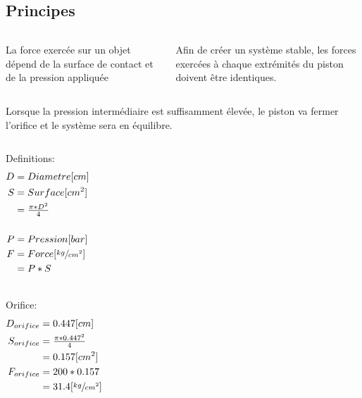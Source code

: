 \documentclass[aspectratio=1610,english,12pt]{beamer}
\begin{document}
\subsection{Principes}

\begin{frame}{\insertsubsection}
	\begin{columns}[onlytextwidth]
			La force exercée sur un objet dépend de la surface de contact et de la pression appliquée\par
			Afin de créer un système stable, les forces exercées à chaque extrémités du piston doivent être identiques.
	\end{columns}
\end{frame}

\begin{frame}{\insertsubsection}
	\begin{columns}[onlytextwidth]
			Lorsque la pression intermédiaire est suffisamment élevée, le piston va fermer l'orifice et le système sera en équilibre.
	\end{columns}
\end{frame}

\begin{frame}{\insertsubsection}
	\begin{columns}[onlytextwidth]
			Definitions:
			\begin{align*}
				D &= Diametre [cm] \\
				S &= Surface [cm^2] \\
				  &= \tfrac{\pi*D^2}{4} \\
				\\
				P &= Pression [bar] \\
				F &= Force [\sfrac{kg}{cm^2}]\\
				  &= P*S \\		
			\end{align*}
	\end{columns}
\end{frame}

\begin{frame}{\insertsubsection}
	\begin{columns}[onlytextwidth]
			Orifice:
			\begin{align*}
				D_{orifice} &= 0.447[cm] \\
				S_{orifice} &= \tfrac{\pi*0.447^2}{4}\\
				  &= 0.157[cm^2] \\
				F_{orifice} &= 200*0.157\\
				  &= 31.4 [\sfrac{kg}{cm^2}]
			\end{align*}
	\end{columns}
\end{frame}
\end{document}

